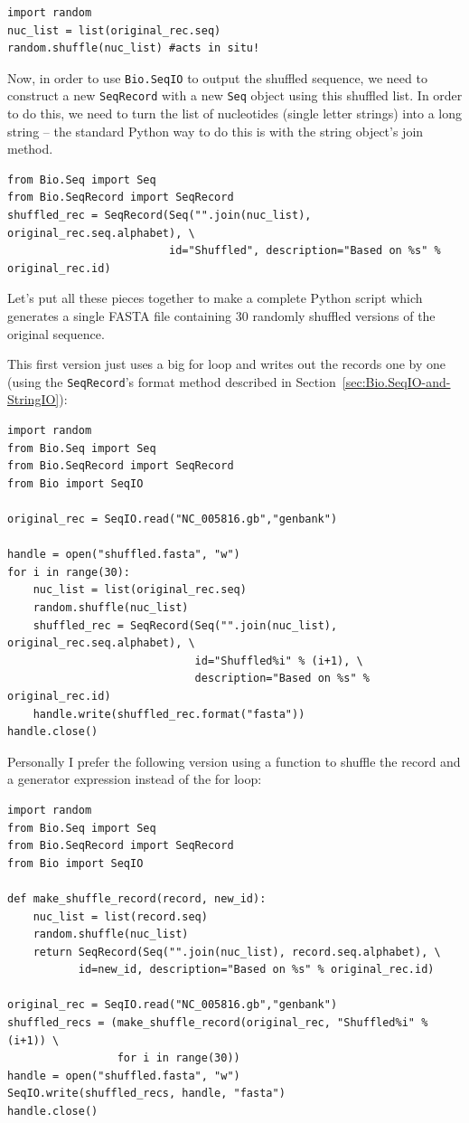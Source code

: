 \documentclass{report}
\begin{document}
\begin{verbatim}
import random
nuc_list = list(original_rec.seq)
random.shuffle(nuc_list) #acts in situ!
\end{verbatim}

Now, in order to use \verb|Bio.SeqIO| to output the shuffled sequence, we need
to construct a new \verb|SeqRecord| with a new \verb|Seq| object using this
shuffled list.  In order to do this, we need to turn the list of nucleotides
(single letter strings) into a long string -- the standard Python way to do
this is with the string object's join method.

\begin{verbatim}
from Bio.Seq import Seq
from Bio.SeqRecord import SeqRecord
shuffled_rec = SeqRecord(Seq("".join(nuc_list), original_rec.seq.alphabet), \
                         id="Shuffled", description="Based on %s" % original_rec.id)
\end{verbatim}

Let's put all these pieces together to make a complete Python script which
generates a single FASTA file containing 30 randomly shuffled versions of
the original sequence.

This first version just uses a big for loop and writes out the records one by one
(using the \verb|SeqRecord|'s format method described in
Section~\ref{sec:Bio.SeqIO-and-StringIO}):

\begin{verbatim}
import random
from Bio.Seq import Seq
from Bio.SeqRecord import SeqRecord
from Bio import SeqIO

original_rec = SeqIO.read("NC_005816.gb","genbank")

handle = open("shuffled.fasta", "w")
for i in range(30):
    nuc_list = list(original_rec.seq)
    random.shuffle(nuc_list)
    shuffled_rec = SeqRecord(Seq("".join(nuc_list), original_rec.seq.alphabet), \
                             id="Shuffled%i" % (i+1), \
                             description="Based on %s" % original_rec.id)
    handle.write(shuffled_rec.format("fasta"))
handle.close()
\end{verbatim}

Personally I prefer the following version using a function to shuffle the record
and a generator expression instead of the for loop:

\begin{verbatim}
import random
from Bio.Seq import Seq
from Bio.SeqRecord import SeqRecord
from Bio import SeqIO

def make_shuffle_record(record, new_id):
    nuc_list = list(record.seq)
    random.shuffle(nuc_list)
    return SeqRecord(Seq("".join(nuc_list), record.seq.alphabet), \
           id=new_id, description="Based on %s" % original_rec.id)
   
original_rec = SeqIO.read("NC_005816.gb","genbank")
shuffled_recs = (make_shuffle_record(original_rec, "Shuffled%i" % (i+1)) \
                 for i in range(30))
handle = open("shuffled.fasta", "w")
SeqIO.write(shuffled_recs, handle, "fasta")
handle.close()
\end{verbatim}
\end{document}
